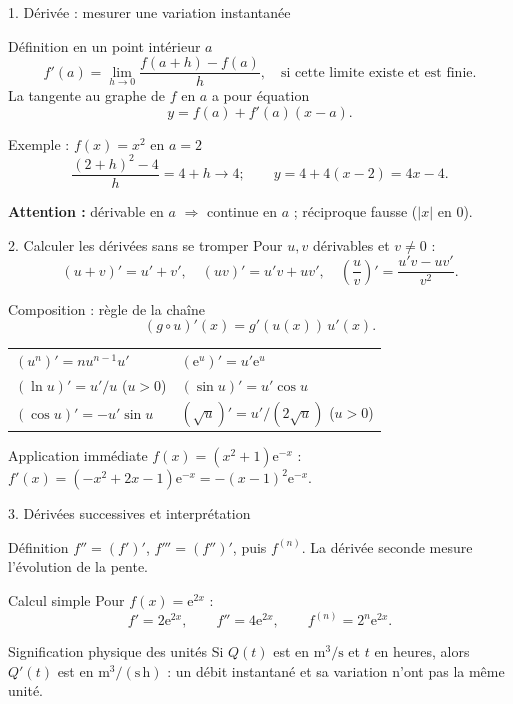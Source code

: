 \documentclass[aspectratio=169,11pt]{beamer}
\newcommand{\e}{\mathrm e}
\begin{document}
\begin{frame}{1. Dérivée : mesurer une variation instantanée}
\begin{block}{Définition en un point intérieur $a$}
\[f'(a)=\lim_{h\to0}\frac{f(a+h)-f(a)}{h},\quad\text{si cette limite existe et est finie.}\]
La tangente au graphe de $f$ en $a$ a pour équation
\[y=f(a)+f'(a)(x-a).\]
\end{block}
\begin{exampleblock}{Exemple : $f(x)=x^2$ en $a=2$}
\[\frac{(2+h)^2-4}{h}=4+h\to4;\qquad y=4+4(x-2)=4x-4.\]
\end{exampleblock}
\smallskip
{\small\color{Corail}\textbf{Attention :} dérivable en $a$ $\Rightarrow$ continue en $a$ ; réciproque fausse ($|x|$ en 0).}
\end{frame}

\begin{frame}{2. Calculer les dérivées sans se tromper}
Pour $u,v$ dérivables et $v\ne0$ :
\[ (u+v)'=u'+v',\quad (uv)'=u'v+uv',\quad
\left(\frac uv\right)'=\frac{u'v-uv'}{v^2}. \]
\begin{block}{Composition : règle de la chaîne}
\[(g\circ u)'(x)=g'(u(x))\,u'(x).\]
\vspace{-.3cm}
\begin{tabularx}{\textwidth}{@{}XX@{}}
$(u^n)'=nu^{n-1}u'$ & $(\e^u)'=u'\e^u$\\
$(\ln u)'=u'/u$ ($u>0$) & $(\sin u)'=u'\cos u$\\
$(\cos u)'=-u'\sin u$ & $(\sqrt u)'=u'/(2\sqrt u)$ ($u>0$)
\end{tabularx}
\end{block}
\begin{exampleblock}{Application immédiate}
$f(x)=(x^2+1)\e^{-x}$ : \quad $f'(x)=(-x^2+2x-1)\e^{-x}=-(x-1)^2\e^{-x}$.
\end{exampleblock}
\end{frame}

\begin{frame}{3. Dérivées successives et interprétation}
\begin{block}{Définition}
$f''=(f')'$, $f'''=(f'')'$, puis $f^{(n)}$. La dérivée seconde mesure l'évolution de la pente.
\end{block}
\begin{exampleblock}{Calcul simple}
Pour $f(x)=\e^{2x}$ :
\[f'=2\e^{2x},\qquad f''=4\e^{2x},\qquad f^{(n)}=2^n\e^{2x}.\]
\end{exampleblock}
\begin{alertblock}{Signification physique des unités}
Si $Q(t)$ est en $\mathrm{m^3/s}$ et $t$ en heures, alors $Q'(t)$ est en $\mathrm{m^3/(s\,h)}$ : un débit instantané et sa variation n'ont pas la même unité.
\end{alertblock}
\end{frame}
\end{document}
